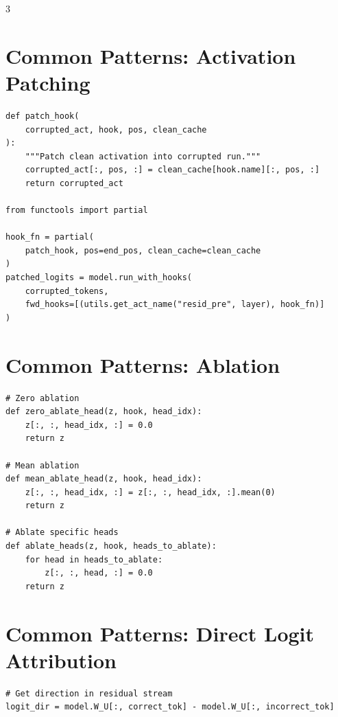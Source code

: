\documentclass[10pt,a4paper,landscape]{article}
\begin{document}
\begin{multicols}{3}
\section{Common Patterns: Activation Patching}

\begin{lstlisting}
def patch_hook(
    corrupted_act, hook, pos, clean_cache
):
    """Patch clean activation into corrupted run."""
    corrupted_act[:, pos, :] = clean_cache[hook.name][:, pos, :]
    return corrupted_act

from functools import partial

hook_fn = partial(
    patch_hook, pos=end_pos, clean_cache=clean_cache
)
patched_logits = model.run_with_hooks(
    corrupted_tokens,
    fwd_hooks=[(utils.get_act_name("resid_pre", layer), hook_fn)]
)
\end{lstlisting}

\section{Common Patterns: Ablation}

\begin{lstlisting}
# Zero ablation
def zero_ablate_head(z, hook, head_idx):
    z[:, :, head_idx, :] = 0.0
    return z

# Mean ablation
def mean_ablate_head(z, hook, head_idx):
    z[:, :, head_idx, :] = z[:, :, head_idx, :].mean(0)
    return z

# Ablate specific heads
def ablate_heads(z, hook, heads_to_ablate):
    for head in heads_to_ablate:
        z[:, :, head, :] = 0.0
    return z
\end{lstlisting}

\section{Common Patterns: Direct Logit Attribution}

\begin{lstlisting}
# Get direction in residual stream
logit_dir = model.W_U[:, correct_tok] - model.W_U[:, incorrect_tok]


\end{lstlisting}
\end{multicols}
\end{document}
